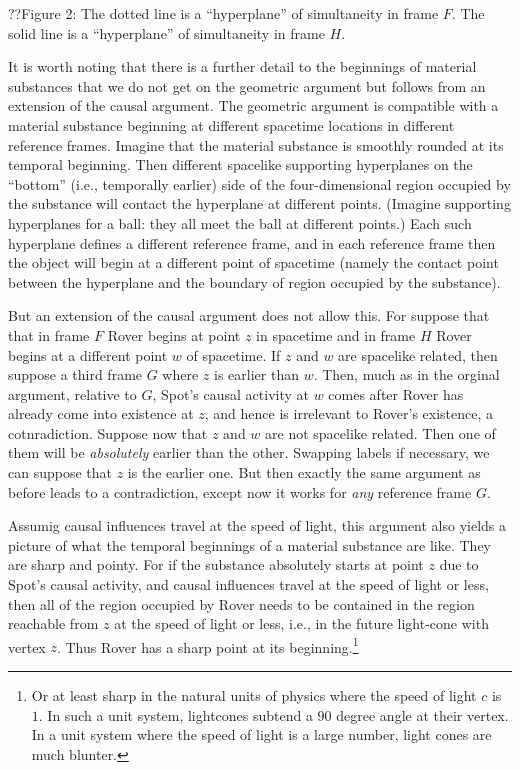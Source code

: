 ??Figure 2: The dotted line is a ``hyperplane'' of simultaneity in frame $F$. The solid line is a ``hyperplane'' of simultaneity in frame $H$.

It is worth noting that there is a further detail to the beginnings of material substances that we do not get on the 
geometric argument but follows from an extension of the causal argument. The geometric argument is compatible with a material substance 
beginning at different spacetime locations in different reference frames. Imagine that the material substance is smoothly 
rounded at its temporal beginning. Then different spacelike supporting hyperplanes on the ``bottom'' (i.e., temporally earlier) 
side of the four-dimensional region occupied by the substance will contact the hyperplane at different points. (Imagine supporting hyperplanes for a ball: they all meet the ball at different points.) Each such hyperplane defines a different reference frame,
and in each reference frame then the object will begin at a different point of spacetime (namely the contact point between 
the hyperplane and the boundary of region occupied by the substance). 

But an extension of the causal argument does not allow this. For suppose that that in frame $F$ Rover begins at 
point $z$ in spacetime and in frame $H$ Rover begins at a different point $w$ of spacetime. If $z$ and $w$ are spacelike 
related, then suppose a third frame $G$ where $z$ is earlier than $w$. Then, much as in the orginal argument, relative to 
$G$, Spot's causal activity at $w$ comes after Rover has already come into existence at $z$, and hence is irrelevant to Rover's 
existence, a cotnradiction. Suppose now that $z$ and $w$ are not spacelike related. Then one of them will be \textit{absolutely}
earlier than the other. Swapping labels if necessary, we can suppose that $z$ is the earlier one. But then exactly the same 
argument as before leads to a contradiction, except now it works for \textit{any} reference frame $G$. 

Assumig causal influences travel at the speed of light, this argument also yields a picture of what the temporal beginnings of 
a material substance are like. They are sharp and pointy. For if the substance absolutely starts at point $z$ due to Spot's 
causal activity, and causal influences travel at the speed of light or less, then all of the region occupied by Rover needs
to be contained in the region reachable from $z$ at the speed of light or less, i.e., in the future light-cone with vertex $z$.
Thus Rover has a sharp point at its beginning.\footnote{Or at least sharp in the natural units of physics where the speed of 
light $c$ is $1$. In such a unit system, lightcones subtend a $90$ degree angle at their vertex. In a unit system where the 
speed of light is a large number, light cones are much blunter.}


